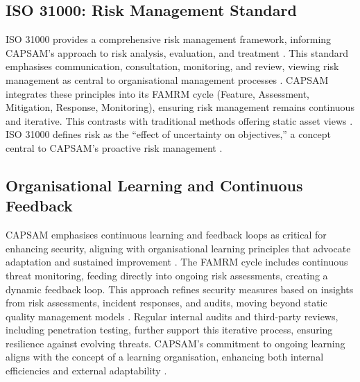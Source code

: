     \subsection{ISO 31000: Risk Management Standard}
    ISO 31000 provides a comprehensive risk management framework, informing CAPSAM's approach to risk analysis, evaluation, and treatment \citep{purdy2010iso}. This standard emphasises communication, consultation, monitoring, and review, viewing risk management as central to organisational management processes \citep{purdy2010iso}. CAPSAM integrates these principles into its FAMRM cycle (Feature, Assessment, Mitigation, Response, Monitoring), ensuring risk management remains continuous and iterative. This contrasts with traditional methods offering static asset views \citep{shedden2010information}. ISO 31000 defines risk as the “effect of uncertainty on objectives,” a concept central to CAPSAM’s proactive risk management \citep{purdy2010iso}.
    
    \subsection{Organisational Learning and Continuous Feedback}
    CAPSAM emphasises continuous learning and feedback loops as critical for enhancing security, aligning with organisational learning principles that advocate adaptation and sustained improvement \citep{murray2003continuous}. The FAMRM cycle includes continuous threat monitoring, feeding directly into ongoing risk assessments, creating a dynamic feedback loop. This approach refines security measures based on insights from risk assessments, incident responses, and audits, moving beyond static quality management models \citep{murray2003continuous}. Regular internal audits and third-party reviews, including penetration testing, further support this iterative process, ensuring resilience against evolving threats. CAPSAM's commitment to ongoing learning aligns with the concept of a learning organisation, enhancing both internal efficiencies and external adaptability \citep{murray2003continuous}.
    
